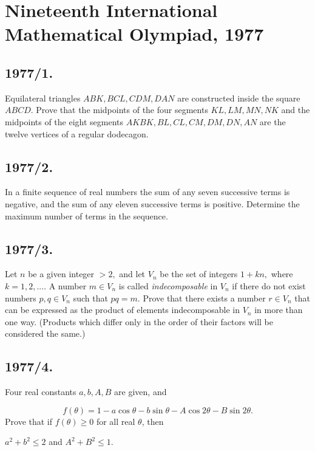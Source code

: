 \documentclass[12pt,thmsa]{article}
\begin{document}
\section{Nineteenth International Mathematical Olympiad, 1977}

\subsection{1977/1. }

Equilateral triangles $ABK,BCL,CDM,DAN$ are constructed inside the square $%
ABCD.$ Prove that the midpoints of the four segments $KL,LM,MN,NK$ and the
midpoints of the eight segments $AKBK,BL,CL,CM,DM,DN,AN$ are the twelve
vertices of a regular dodecagon.

\subsection{1977/2. }

In a finite sequence of real numbers the sum of any seven successive terms
is negative, and the sum of any eleven successive terms is positive.
Determine the maximum number of terms in the sequence.

\subsection{1977/3. }

Let $n$ be a given integer $>2,$ and let $V_{n}$ be the set of integers $%
1+kn,$ where $k=1,2,...$. A number $m\in V_{n}$  is called \emph{%
indecomposable} in $V_{n}$ if there do not exist numbers $p,q\in V_{n}$ such
that $pq=m.$ Prove that there exists a number $r\in V_{n}$ that can be
expressed as the product of elements indecomposable in $V_{n}$ in more than
one way. (Products which differ only in the order of their factors will be
considered the same.)

\subsection{1977/4. }

Four real constants $a,b,A,B$ are given, and

\[
f(\theta )=1-a\cos \theta -b\sin \theta -A\cos 2\theta -B\sin 2\theta .
\]
Prove that if $f(\theta )\geq 0$ for all real $\theta $, then

\begin{center}
$a^{2}+b^{2}\leq 2$ and $A^{2}+B^{2}\leq 1.$
\end{center}
\end{document}
